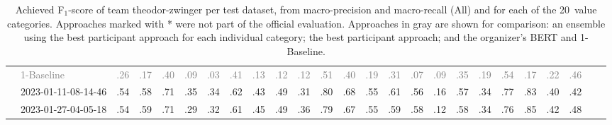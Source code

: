 \begin{table*}
\begin{tabular}{@{}ll@{\hspace{10pt}}c@{\hspace{5pt}}cccccccccccccccccccccc@{}}
& \textcolor{gray}{1-Baseline} & \textcolor{gray}{.26} & \textcolor{gray}{.17} & \textcolor{gray}{.40} & \textcolor{gray}{.09} & \textcolor{gray}{.03} & \textcolor{gray}{.41} & \textcolor{gray}{.13} & \textcolor{gray}{.12} & \textcolor{gray}{.12} & \textcolor{gray}{.51} & \textcolor{gray}{.40} & \textcolor{gray}{.19} & \textcolor{gray}{.31} & \textcolor{gray}{.07} & \textcolor{gray}{.09} & \textcolor{gray}{.35} & \textcolor{gray}{.19} & \textcolor{gray}{.54} & \textcolor{gray}{.17} & \textcolor{gray}{.22} & \textcolor{gray}{.46} \\
& 2023-01-11-08-14-46 & .54 & .58 & .71 & .35 & .34 & .62 & .43 & .49 & .31 & .80 & .68 & .55 & .61 & .56 & .16 & .57 & .34 & .77 & .83 & .40 & .42 \\
& 2023-01-27-04-05-18 & .54 & .59 & .71 & .29 & .32 & .61 & .45 & .49 & .36 & .79 & .67 & .55 & .59 & .58 & .12 & .58 & .34 & .76 & .85 & .42 & .48 \\
\bottomrule
\end{tabular}
\caption{Achieved F$_1$-score of team theodor-zwinger per test dataset, from macro-precision and macro-recall (All) and for each of the 20~value categories. Approaches marked with * were not part of the official evaluation. Approaches in gray are shown for comparison: an ensemble using the best participant approach for each individual category; the best participant approach; and the organizer's BERT and 1-Baseline.}
\label{table-results}
\end{table*}
